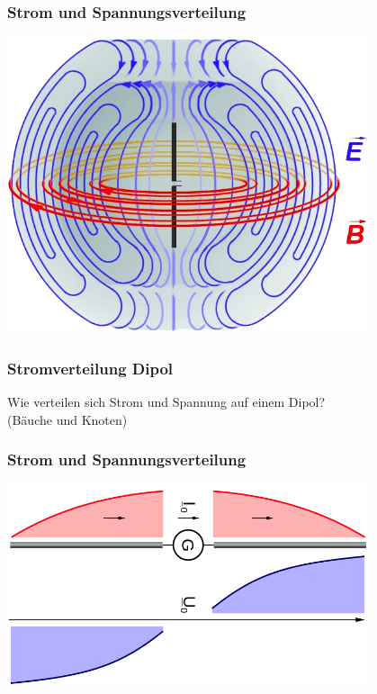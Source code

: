 \begin{frame}
    \frametitle{Strom und Spannungsverteilung}
    \begin{center}
        \includegraphics[width=0.8\textwidth]{a09/Felder_um_Dipol.png}
        \tiny \hyperlink{refs}{\cite{wm}} \\[1em] \large
    \end{center}
\end{frame}

\begin{frame}
    \frametitle{Stromverteilung Dipol}
    \begin{center}
    \Large Wie verteilen sich Strom und Spannung auf einem Dipol? \\ (Bäuche und Knoten)
    \end{center}
\end{frame}

\begin{frame}
    \frametitle{Strom und Spannungsverteilung}
    \begin{center}
        \includegraphics[width=0.8\textwidth]{a09/DipolUI.png}
        \tiny \hyperlink{refs}{\cite{wm}} \\[1em] \large
    \end{center}
\end{frame}

